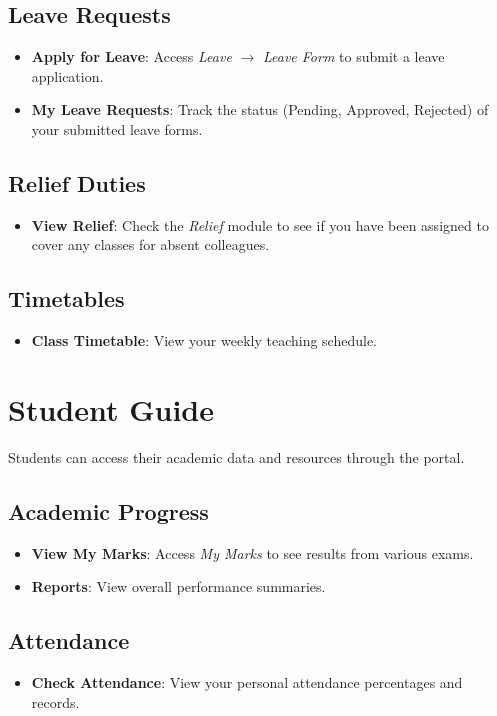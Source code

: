 \documentclass[12pt, a4paper]{report}
\begin{document}
\section{Leave Requests}
\begin{itemize}
    \item \textbf{Apply for Leave}: Access \textit{Leave} $\rightarrow$ \textit{Leave Form} to submit a leave application.
    \item \textbf{My Leave Requests}: Track the status (Pending, Approved, Rejected) of your submitted leave forms.
\end{itemize}

\section{Relief Duties}
\begin{itemize}
    \item \textbf{View Relief}: Check the \textit{Relief} module to see if you have been assigned to cover any classes for absent colleagues.
\end{itemize}

\section{Timetables}
\begin{itemize}
    \item \textbf{Class Timetable}: View your weekly teaching schedule.
\end{itemize}

\chapter{Student Guide}
Students can access their academic data and resources through the portal.

\section{Academic Progress}
\begin{itemize}
    \item \textbf{View My Marks}: Access \textit{My Marks} to see results from various exams.
    \item \textbf{Reports}: View overall performance summaries.
\end{itemize}

\section{Attendance}
\begin{itemize}
    \item \textbf{Check Attendance}: View your personal attendance percentages and records.
\end{itemize}
\end{document}
